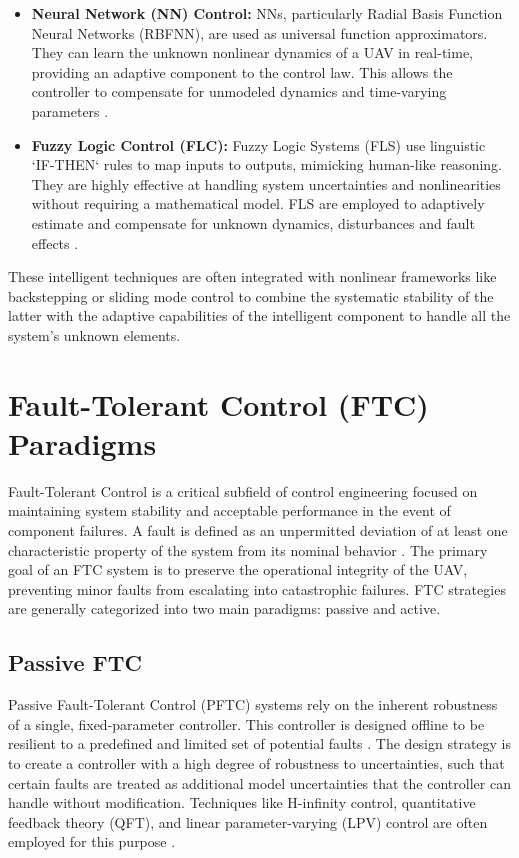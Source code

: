 \begin{itemize}
    \item \textbf{Neural Network (NN) Control:} NNs, particularly Radial Basis Function Neural Networks (RBFNN), are used as universal function approximators. They can learn the unknown nonlinear dynamics of a UAV in real-time, providing an adaptive component to the control law. This allows the controller to compensate for unmodeled dynamics and time-varying parameters  \cite{my1article}.

    \item \textbf{Fuzzy Logic Control (FLC):} Fuzzy Logic Systems (FLS) use linguistic `IF-THEN` rules to map inputs to outputs, mimicking human-like reasoning. They are highly effective at handling system uncertainties and nonlinearities without requiring a mathematical model. FLS are employed to adaptively estimate and compensate for unknown dynamics, disturbances and fault effects  \cite{my2article}.
\end{itemize}
These intelligent techniques are often integrated with nonlinear frameworks like backstepping or sliding mode control to combine the systematic stability of the latter with the adaptive capabilities of the intelligent component to handle all the system's unknown elements.

\section{Fault-Tolerant Control (FTC) Paradigms}
\label{sec:ftc_paradigms}
Fault-Tolerant Control  is a critical subfield of control engineering focused on maintaining system stability and acceptable performance in the event of component failures. A fault is defined as an unpermitted deviation of at least one characteristic property of the system from its nominal behavior  \cite{ftc1,ftc2,ftc3,ftc4}. The primary goal of an FTC system is to preserve the operational integrity of the UAV, preventing minor faults from escalating into catastrophic failures. FTC strategies are generally categorized into two main paradigms: passive and active.

\subsection{Passive FTC}
Passive Fault-Tolerant Control (PFTC) systems rely on the inherent robustness of a single, fixed-parameter controller. This controller is designed offline to be resilient to a predefined and limited set of potential faults  \cite{passive1}. The design strategy is to create a controller with a high degree of robustness to uncertainties, such that certain faults are treated as additional model uncertainties that the controller can handle without modification. Techniques like H-infinity control, quantitative feedback theory (QFT), and linear parameter-varying (LPV) control are often employed for this purpose \cite{passive2,passive3,passive4}.


